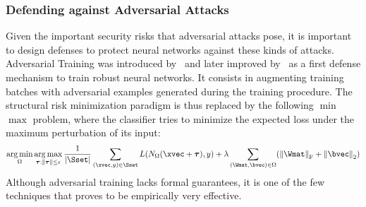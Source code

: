 \subsubsection{Defending against Adversarial Attacks}
\label{subsubsection:ch2-defending_against_adversarial_attacks}

Given the important security risks that adversarial attacks pose, it is important to design defenses to protect neural networks against these kinds of attacks.
Adversarial Training was introduced by~\citet{goodfellow2014explaining} and later improved by~\citet{madry2018towards} as a first defense mechanism to train robust neural networks.
It consists in augmenting training batches with adversarial examples generated during the training procedure.
The structural risk minimization paradigm is thus replaced by the following $\min$ $\max$ problem, where the classifier tries to minimize the expected loss under the maximum perturbation of its input:
\begin{equation}
  \argmin_\weights \argmax_{\adv: \norm{\adv} \leq \epsilon} \frac{1}{|\Sset|} \sum_{(\xvec, y) \in \Sset} L\left( \nn_\weights \left(\xvec + \adv \right), y \right) + \lambda \sum_{(\Wmat, \bvec) \in \weights} \left( \norm{\Wmat}_\mathrm{F} + \norm{\bvec}_\mathrm{2} \right)
\end{equation}
Although adversarial training lacks formal guarantees, it is one of the few techniques that proves to be empirically very effective.






%
%
%



